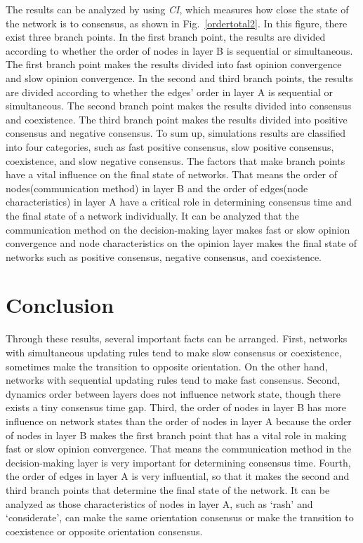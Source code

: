 The results can be analyzed by using \textit{CI}, which measures how close the state of the network is to consensus, as shown in Fig.~\ref{ordertotal2}. In this figure, there exist three branch points. In the first branch point, the results are divided according to whether the order of nodes in layer B is sequential or simultaneous. The first branch point makes the results divided into fast opinion convergence and slow opinion convergence. In the second and third branch points, the results are divided according to whether the edges' order in layer A is sequential or simultaneous. The second branch point makes the results divided into consensus and coexistence. The third branch point makes the results divided into positive consensus and negative consensus. To sum up, simulations results are classified into four categories, such as fast positive consensus, slow positive consensus, coexistence, and slow negative consensus. The factors that make branch points have a vital influence on the final state of networks. That means the order of nodes(communication method) in layer B and the order of edges(node characteristics) in layer A have a critical role in determining consensus time and the final state of a network individually. It can be analyzed that the communication method on the decision-making layer makes fast or slow opinion convergence and node characteristics on the opinion layer makes the final state of networks such as positive consensus, negative consensus, and coexistence. \\

\section{Conclusion}
Through these results, several important facts can be arranged. First, networks with simultaneous updating rules tend to make slow consensus or coexistence, sometimes make the transition to opposite orientation. On the other hand, networks with sequential updating rules tend to make fast consensus. Second, dynamics order between layers does not influence network state, though there exists a tiny consensus time gap. Third, the order of nodes in layer B has more influence on network states than the order of nodes in layer A because the order of nodes in layer B makes the first branch point that has a vital role in making fast or slow opinion convergence. That means the communication method in the decision-making layer is very important for determining consensus time. Fourth, the order of edges in layer A is very influential, so that it makes the second and third branch points that determine the final state of the network. It can be analyzed as those characteristics of nodes in layer A, such as `rash' and `considerate', can make the same orientation consensus or make the transition to coexistence or opposite orientation consensus.\\



